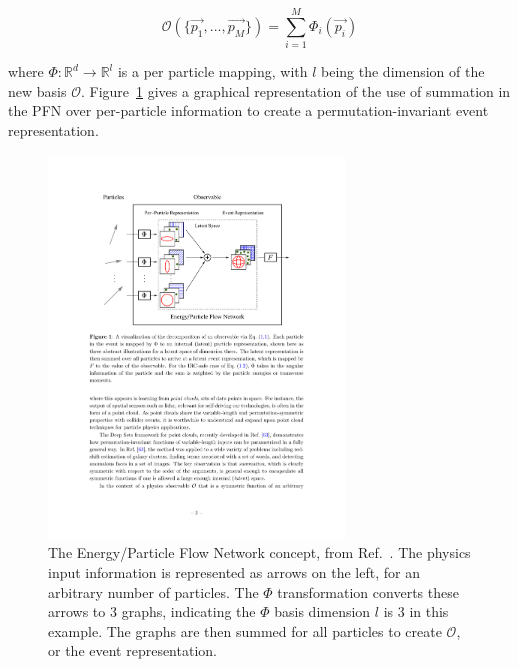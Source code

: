 \begin{equation}
  \mathcal{O}(\{\vec{p_1},...,\vec{p_M}\}) = \sum_{i=1}^M \Phi_i(\vec{p_i})
  \label{eq:pfn}
\end{equation}

where $\Phi : \mathbb{R}^d \rightarrow \mathbb{R}^l$ is a per particle mapping, with $l$ being the dimension of the new basis $\mathcal{O}$. Figure~\ref{fig:pfn_paper} gives a graphical representation of the use of summation in the PFN over per-particle information to create a permutation-invariant event representation. \par
\begin{figure}[!htbp]
\centering
   \includegraphics[width=0.7\textwidth]{figures/ml/pfn_paper}
    \caption{The Energy/Particle Flow Network concept, from Ref.~\cite{pfn}. The physics input information is represented as arrows on the left, for an arbitrary number of particles. The $\Phi$ transformation converts these arrows to 3 graphs, indicating the $\Phi$ basis dimension $l$ is 3 in this example. The graphs are then summed for all particles to create $\mathcal{O}$, or the event representation.
    \label{fig:pfn_paper}}
\end{figure}

